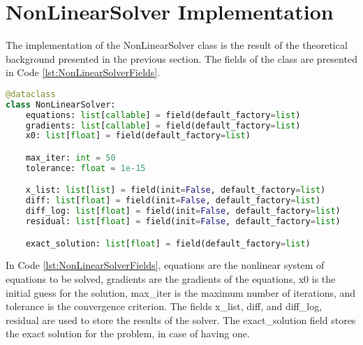 \section{NonLinearSolver Implementation} \label{sec:nonlinear_solver_implementation}
The implementation of the NonLinearSolver class is the result of the theoretical background presented in the previous section. The fields of the class are presented in Code \ref{lst:NonLinearSolverFields}. 
\begin{lstlisting}[language=Python, caption=NonLinearSolver class fields, label=lst:NonLinearSolverFields]
@dataclass
class NonLinearSolver:
    equations: list[callable] = field(default_factory=list) 
    gradients: list[callable] = field(default_factory=list) 
    x0: list[float] = field(default_factory=list) 

    max_iter: int = 50 
    tolerance: float = 1e-15 

    x_list: list[list] = field(init=False, default_factory=list)  
    diff: list[float] = field(init=False, default_factory=list) 
    diff_log: list[float] = field(init=False, default_factory=list) 
    residual: list[float] = field(init=False, default_factory=list) 

    exact_solution: list[float] = field(default_factory=list)
\end{lstlisting}

In Code \ref{lst:NonLinearSolverFields}, equations are the nonlinear system of equations to be solved, gradients are the gradients of the equations, x0 is the initial guess for the solution, max\_iter is the maximum number of iterations, and tolerance is the convergence criterion. The fields x\_list, diff, and diff\_log, residual are used to store the results of the solver. The exact\_solution field stores the exact solution for the problem, in case of having one. 

